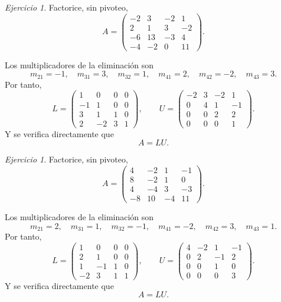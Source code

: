 \documentclass[12pt]{article}
\theoremstyle{remark}
\newtheorem{Ejer}[definicion]{Ejercicio}
\begin{document}
\begin{Ejer} Factorice, sin pivoteo,
\[
A=\begin{pmatrix}-2 & 3 & -2 & 1\\2 & 1 & 3 & -2\\-6 & 13 & -3 & 4\\-4 & -2 & 0 & 11\end{pmatrix}.
\]

Los multiplicadores de la eliminación son
\[
m_{21}=-1,\quad m_{31}=3,\quad m_{32}=1,\quad m_{41}=2,\quad m_{42}=-2,\quad m_{43}=3.
\]
Por tanto,
\[
L=\begin{pmatrix}1 & 0 & 0 & 0\\-1 & 1 & 0 & 0\\3 & 1 & 1 & 0\\2 & -2 & 3 & 1\end{pmatrix},\qquad U=\begin{pmatrix}-2 & 3 & -2 & 1\\0 & 4 & 1 & -1\\0 & 0 & 2 & 2\\0 & 0 & 0 & 1\end{pmatrix}.
\]
Y se verifica directamente que
\[
\boxed{A=LU}.
\]
\end{Ejer}
\begin{Ejer} Factorice, sin pivoteo,
\[
A=\begin{pmatrix}4 & -2 & 1 & -1\\8 & -2 & 1 & 0\\4 & -4 & 3 & -3\\-8 & 10 & -4 & 11\end{pmatrix}.
\]

Los multiplicadores de la eliminación son
\[
m_{21}=2,\quad m_{31}=1,\quad m_{32}=-1,\quad m_{41}=-2,\quad m_{42}=3,\quad m_{43}=1.
\]
Por tanto,
\[
L=\begin{pmatrix}1 & 0 & 0 & 0\\2 & 1 & 0 & 0\\1 & -1 & 1 & 0\\-2 & 3 & 1 & 1\end{pmatrix},\qquad U=\begin{pmatrix}4 & -2 & 1 & -1\\0 & 2 & -1 & 2\\0 & 0 & 1 & 0\\0 & 0 & 0 & 3\end{pmatrix}.
\]
Y se verifica directamente que
\[
\boxed{A=LU}.
\]
\end{Ejer}
\end{document}
